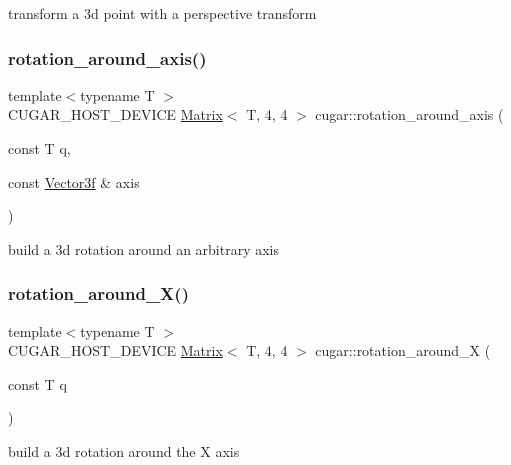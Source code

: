 transform a 3d point with a perspective transform \mbox{\label{group___matrices_module_ga5aabd5a72dab7887d3c7f21a58f4fd2e}} 
\subsubsection{\texorpdfstring{rotation\+\_\+around\+\_\+axis()}{rotation\_around\_axis()}}
{\footnotesize\ttfamily template$<$typename T $>$ \\
C\+U\+G\+A\+R\+\_\+\+H\+O\+S\+T\+\_\+\+D\+E\+V\+I\+CE \hyperlink{structcugar_1_1_matrix}{Matrix}$<$ T, 4, 4 $>$ cugar\+::rotation\+\_\+around\+\_\+axis (\begin{DoxyParamCaption}\item[{const T}]{q,  }\item[{const \hyperlink{structcugar_1_1_vector}{Vector3f} \&}]{axis }\end{DoxyParamCaption})}

build a 3d rotation around an arbitrary axis \mbox{\label{group___matrices_module_ga96490d5b84762c163e1420ec687b548e}} 
\subsubsection{\texorpdfstring{rotation\+\_\+around\+\_\+\+X()}{rotation\_around\_X()}}
{\footnotesize\ttfamily template$<$typename T $>$ \\
C\+U\+G\+A\+R\+\_\+\+H\+O\+S\+T\+\_\+\+D\+E\+V\+I\+CE \hyperlink{structcugar_1_1_matrix}{Matrix}$<$ T, 4, 4 $>$ cugar\+::rotation\+\_\+around\+\_\+X (\begin{DoxyParamCaption}\item[{const T}]{q }\end{DoxyParamCaption})}

build a 3d rotation around the X axis \mbox{\label{group___matrices_module_gae9bd2299be5c9fabb44c201f74daac31}} 
